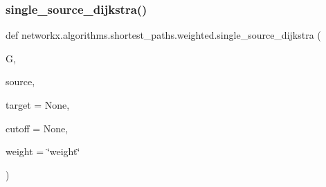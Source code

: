 \subsubsection{\texorpdfstring{single\+\_\+source\+\_\+dijkstra()}{single\_source\_dijkstra()}}
{\footnotesize\ttfamily def networkx.\+algorithms.\+shortest\+\_\+paths.\+weighted.\+single\+\_\+source\+\_\+dijkstra (\begin{DoxyParamCaption}\item[{}]{G,  }\item[{}]{source,  }\item[{}]{target = {\ttfamily None},  }\item[{}]{cutoff = {\ttfamily None},  }\item[{}]{weight = {\ttfamily \char`\"{}weight\char`\"{}} }\end{DoxyParamCaption})}


